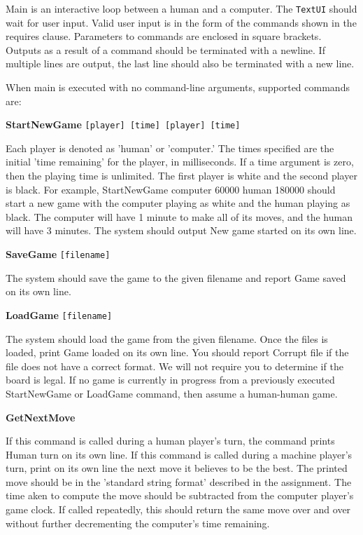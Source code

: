 

		Main is an interactive loop between a human and a computer. The \texttt{TextUI} should 
		wait for user input. Valid user input is in the form of the commands shown in 
		the requires clause. Parameters to commands are enclosed in square brackets. 
		Outputs as a result of a command should be terminated with a newline. If 
		multiple lines are output, the last line should also be terminated with a new 
		line.

		When main is executed with no command-line arguments, supported commands are:

		\textbf{StartNewGame} \texttt{[player] [time] [player] [time]}
    
    Each player is denoted as 'human' or 'computer.' The times specified are the 
    initial 'time remaining' for the player, in milliseconds. If a time argument is 
    zero, then the playing time is unlimited. The first player is white and the second 
    player is black. For example, StartNewGame computer 60000 human 180000 should start 
    a new game with the computer playing as white and the human playing as black. The 
    computer will have 1 minute to make all of its moves, and the human will have 3 
    minutes. The system should output New game started on its own line.

		\textbf{SaveGame} \texttt{[filename]}
    
    The system should save the game to the given filename and report Game saved on 
    its own line.

		\textbf{LoadGame} \texttt{[filename]}
    
    The system should load the game from the given filename. Once the files is loaded, 
    print Game loaded on its own line. You should report Corrupt file if the file does 
    not have a correct format. We will not require you to determine if the board is 
    legal. If no game is currently in progress from a previously executed StartNewGame 
    or LoadGame command, then assume a human-human game.

		\textbf{GetNextMove}
    
    If this command is called during a human player's turn, the command prints Human 
    turn on its own line. If this command is called during a machine player's turn, 
    print on its own line the next move it believes to be the best. The printed move 
    should be in the 'standard string format' described in the assignment. The time 
    aken to compute the move should be subtracted from the computer player's game clock. 
    If called repeatedly, this should return the same move over and over without further 
    decrementing the computer's time remaining.


